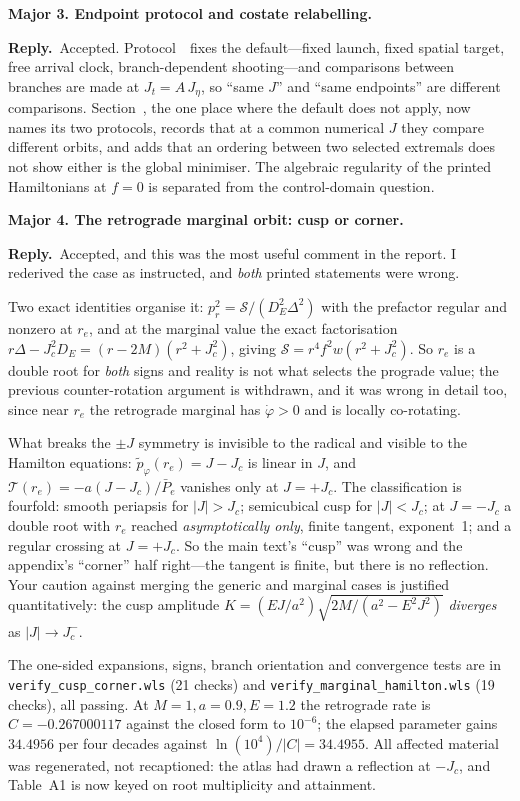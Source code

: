 \documentclass[11pt]{article}
\newcommand{\reply}{\par\noindent\textbf{Reply.}\ }
\newcommand{\R}[1]{\par\medskip\noindent\textbf{#1}\par\nopagebreak}
\begin{document}
\R{Major 3. Endpoint protocol and costate relabelling.}
\reply Accepted. Protocol~\msProtEndpoint\ fixes the default---fixed launch, fixed
spatial target, free arrival clock, branch-dependent shooting---and comparisons
between branches are made at $J_t=A\,J_\eta$, so ``same $J$'' and ``same endpoints''
are different comparisons. Section~\msSecBvp, the one place where the default does
not apply, now names its two protocols, records that at a common numerical $J$ they
compare different orbits, and adds that an ordering between two selected extremals
does not show either is the global minimiser. The algebraic regularity of the
printed Hamiltonians at $f=0$ is separated from the control-domain question.

\R{Major 4. The retrograde marginal orbit: cusp or corner.}
\reply Accepted, and this was the most useful comment in the report. I rederived
the case as instructed, and \emph{both} printed statements were wrong.

Two exact identities organise it: $p_r^2=\mathcal S/(D_E^2\Delta^2)$ with the
prefactor regular and nonzero at $r_e$, and at the marginal value the exact
factorisation $r\Delta-J_c^2D_E=(r-2M)(r^2+J_c^2)$, giving
$\mathcal S=r^4f^2w(r^2+J_c^2)$. So $r_e$ is a double root for \emph{both} signs and
reality is not what selects the prograde value; the previous counter-rotation
argument is withdrawn, and it was wrong in detail too, since near $r_e$ the
retrograde marginal has $\dot\varphi>0$ and is locally co-rotating.

What breaks the $\pm J$ symmetry is invisible to the radical and visible to the
Hamilton equations: $\tilde p_\varphi(r_e)=J-J_c$ is linear in $J$, and
$\mathcal T(r_e)=-a(J-J_c)/\bar P_e$ vanishes only at $J=+J_c$. The classification
is fourfold: smooth periapsis for $|J|>J_c$; semicubical cusp for $|J|<J_c$;
at $J=-J_c$ a double root with $r_e$ reached \emph{asymptotically only}, finite
tangent, exponent~1; and a regular crossing at $J=+J_c$. So the main text's ``cusp''
was wrong and the appendix's ``corner'' half right---the tangent is finite, but
there is no reflection. Your caution against merging the generic and marginal cases
is justified quantitatively: the cusp amplitude $K=(EJ/a^2)\sqrt{2M/(a^2-E^2J^2)}$
\emph{diverges} as $|J|\to J_c^-$.

The one-sided expansions, signs, branch orientation and convergence tests are in
\texttt{verify\_cusp\_corner.wls} (21 checks) and
\texttt{verify\_marginal\_hamilton.wls} (19 checks), all passing. At $M=1,a=0.9,E=1.2$
the retrograde rate is $C=-0.267000117$ against the closed form to $10^{-6}$; the
elapsed parameter gains $34.4956$ per four decades against $\ln(10^4)/|C|=34.4955$.
All affected material was regenerated, not recaptioned: the atlas had drawn a
reflection at $-J_c$, and Table~A1 is now keyed on root multiplicity and attainment.
\end{document}
